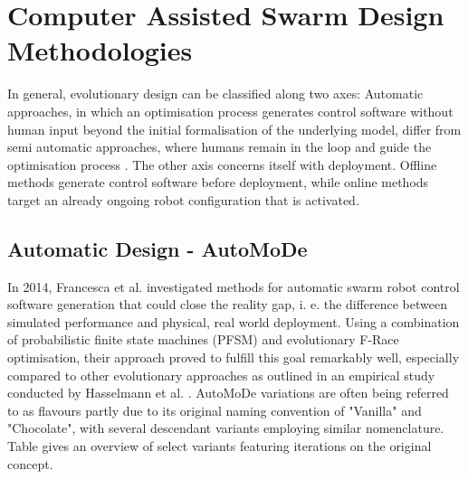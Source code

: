 \documentclass{article}
\begin{document}
\cite{PSOandACO} \cite{SwarmIntelligenceOptimisation}

\section{Computer Assisted Swarm Design Methodologies}
In general, evolutionary design can be classified along two axes: Automatic approaches, in which an optimisation process generates control software without human input beyond the initial formalisation of the underlying model, differ from semi automatic approaches, where humans remain in the loop and guide the optimisation process \cite{recentTrends}. \newline
The other axis concerns itself with deployment. Offline methods generate control software before deployment, while online methods target an already ongoing robot configuration that is activated.

\subsection{Automatic Design - AutoMoDe}
In 2014, Francesca et al. investigated methods for automatic swarm robot control software generation that could close the reality gap, i. e. the difference between simulated performance and physical, real world deployment. Using a combination of probabilistic finite state machines (PFSM) and evolutionary F-Race optimisation, their approach proved to fulfill this goal remarkably well, especially compared to other evolutionary approaches as outlined in an empirical study conducted by Hasselmann et al. \cite{amEmpirical}. AutoMoDe variations are often being referred to as flavours partly due to its original naming convention of "Vanilla" and "Chocolate", with several descendant variants employing similar nomenclature. Table  gives an overview of select variants featuring iterations on the original concept.
\end{document}
